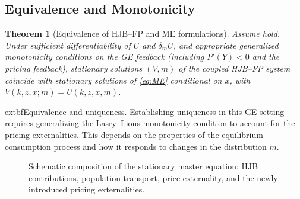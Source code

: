 \documentclass[11pt,letterpaper,oneside]{article}
\providecommand{\ac}[1]{#1}%
\newtheorem{theoremT}{Theorem}
\newenvironment{theorem}[2]{\begin{theoremT}[#1]\label{thm:#2}}{\end{theoremT}}
\newcommand{\LxQ}{\mathcal{L}_x^{\mathbb{Q}}}
\newcommand{\dmU}{\delta_m U}
\begin{document}
\subsection{Equivalence and Monotonicity}

\begin{theorem}{Equivalence of HJB--FP and ME formulations}{equivalence}
Assume  hold. Under sufficient differentiability of $U$ and $\dmU$, and appropriate generalized monotonicity conditions on the GE feedback (including $P'(Y)<0$ and the pricing feedback), stationary solutions $(V,m)$ of the coupled \ac{HJB}--\ac{FP} system coincide with stationary solutions of \eqref{eq:ME} conditional on $x$, with $V(k,z,x;m)=U(k,z,x,m)$.
\end{theorem}

\begin{tcolorbox}[literaturestyle]
  extbf{Equivalence and uniqueness.} Establishing uniqueness in this GE setting requires generalizing the Lasry--Lions monotonicity condition to account for the pricing externalities. This depends on the properties of the equilibrium consumption process and how it responds to changes in the distribution $m$.
\end{tcolorbox}

\begin{figure}[ht]
\centering
{}
\caption{Schematic composition of the stationary master equation: HJB contributions, population transport, price externality, and the newly introduced pricing externalities.}
\end{figure}
\end{document}
